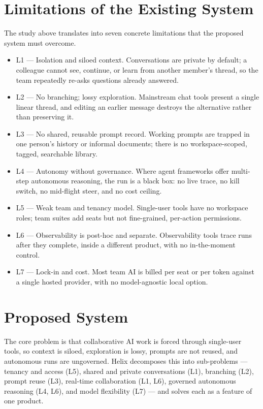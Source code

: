 \documentclass[12pt,a4paper]{report}
\begin{document}
\section{Limitations of the Existing System}
The study above translates into seven concrete limitations that the proposed system must overcome.

\begin{itemize}
  \item L1 --- Isolation and siloed context. Conversations are private by default; a colleague cannot see, continue, or learn from another member's thread, so the team repeatedly re-asks questions already answered.
  \item L2 --- No branching; lossy exploration. Mainstream chat tools present a single linear thread, and editing an earlier message destroys the alternative rather than preserving it.
  \item L3 --- No shared, reusable prompt record. Working prompts are trapped in one person's history or informal documents; there is no workspace-scoped, tagged, searchable library.
  \item L4 --- Autonomy without governance. Where agent frameworks offer multi-step autonomous reasoning, the run is a black box: no live trace, no kill switch, no mid-flight steer, and no cost ceiling.
  \item L5 --- Weak team and tenancy model. Single-user tools have no workspace roles; team suites add seats but not fine-grained, per-action permissions.
  \item L6 --- Observability is post-hoc and separate. Observability tools trace runs after they complete, inside a different product, with no in-the-moment control.
  \item L7 --- Lock-in and cost. Most team AI is billed per seat or per token against a single hosted provider, with no model-agnostic local option.
\end{itemize}

\section{Proposed System}
The core problem is that collaborative AI work is forced through single-user tools, so context is siloed, exploration is lossy, prompts are not reused, and autonomous runs are ungoverned. Helix decomposes this into sub-problems --- tenancy and access (L5), shared and private conversations (L1), branching (L2), prompt reuse (L3), real-time collaboration (L1, L6), governed autonomous reasoning (L4, L6), and model flexibility (L7) --- and solves each as a feature of one product.
\end{document}
